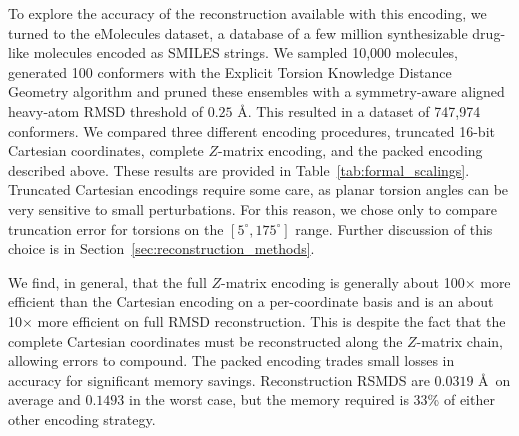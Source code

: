 \documentclass[%
 preprint,
superscriptaddress,
 amsmath,amssymb,
 aip,
 jcp,
]{revtex4-2}
\begin{document}
To explore the accuracy of the reconstruction available with this encoding, we turned to the eMolecules dataset, a database of a few million synthesizable drug-like molecules encoded as SMILES strings.
We sampled 10,000 molecules, generated 100 conformers with the Explicit Torsion Knowledge Distance Geometry algorithm\cite{Riniker2015ETKDG} and pruned these ensembles with a symmetry-aware aligned heavy-atom RMSD threshold of $0.25$ \AA.
This resulted in a dataset of 747,974 conformers.
We compared three different encoding procedures, truncated 16-bit Cartesian coordinates, complete $Z$-matrix encoding, and the packed encoding described above.
These results are provided in Table~\ref{tab:formal_scalings}.
Truncated Cartesian encodings require some care, as planar torsion angles can be very sensitive to small perturbations.
For this reason, we chose only to compare truncation error for torsions on the $[5^\circ, 175^\circ]$ range.
Further discussion of this choice is in Section~\ref{sec:reconstruction_methods}.

\begin{table}[ht]
\begin{center}
 \caption{
    Comparison of coordinate encoding strategies over 747,974 total conformers from 10,000 drug-like molecules
}

\begin{minipage}[c]{\textwidth}

\end{minipage}

\label{tab:formal_scalings}
\par\smallskip
\end{center}
\end{table}

We find, in general, that the full $Z$-matrix encoding is generally about 100$\times$ more efficient than the Cartesian encoding on a per-coordinate basis and is an about 10$\times$ more efficient on full RMSD reconstruction.
This is despite the fact that the complete Cartesian coordinates must be reconstructed along the $Z$-matrix chain, allowing errors to compound.
The packed encoding trades small losses in accuracy for significant memory savings.
Reconstruction RSMDS are $0.0319$ \AA\ on average and $0.1493$ in the worst case, but the memory required is 33\% of either other encoding strategy.
\end{document}
